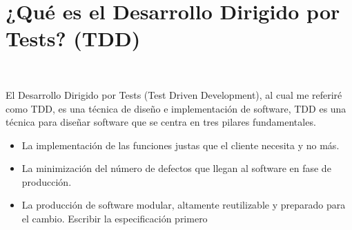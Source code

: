 \section{¿Qué es el Desarrollo Dirigido por Tests? (TDD)} 
\textbf{}\\
\begin{flushleft}
El Desarrollo Dirigido por Tests (Test Driven Development), al cual me referiré como TDD, es una técnica de diseño e implementación de software,
TDD es una técnica para diseñar software que se centra en tres pilares fundamentales.

\begin{itemize}


\item  La implementación de las funciones justas que el cliente necesita y no más.

\item  La minimización del número de defectos que llegan al software en fase de producción.

\item La producción de software modular, altamente reutilizable y preparado para el cambio.
Escribir la especificación primero

	


\end{itemize} 


\end{flushleft}